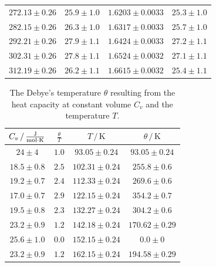 \begin{table}
\begin{tabular}{c c c c}
        $272.13\pm0.26$ & $25.9\pm1.0$ & $1.6203\pm0.0033$ & $25.3\pm1.0$ \\
        $282.15\pm0.26$ & $26.3\pm1.0$ & $1.6317\pm0.0033$ & $25.7\pm1.0$ \\
        $292.21\pm0.26$ & $27.9\pm1.1$ & $1.6424\pm0.0033$ & $27.2\pm1.1$ \\
        $302.31\pm0.26$ & $27.8\pm1.1$ & $1.6524\pm0.0032$ & $27.1\pm1.1$ \\
        $312.19\pm0.26$ & $26.2\pm1.1$ & $1.6615\pm0.0032$ & $25.4\pm1.1$ \\
        \bottomrule
    \end{tabular}
\end{table}

\begin{table}
    \centering
    \caption{The Debye's temperature $\theta$ resulting from the heat capacity at constant volume $C_v$ and the temperature $T$.}
    \label{tab:debye}
    \begin{tabular}{c c c c}
        \toprule
        $C_v \,/\, \unit{\frac{\joule}{\mol \cdot \kelvin}}$ & $\frac{\theta}{T}$ & $T \,/\, \unit{\kelvin}$ & $\theta \,/\, \unit{\kelvin}$ \\
        \midrule
        $24\pm4$ & $1.0$ & $93.05\pm0.24$ & $93.05\pm0.24$ \\
        $18.5\pm0.8$ & $2.5$ & $102.31\pm0.24$ & $255.8\pm0.6$ \\
        $19.2\pm0.7$ & $2.4$ & $112.33\pm0.24$ & $269.6\pm0.6$ \\
        $17.0\pm0.7$ & $2.9$ & $122.15\pm0.24$ & $354.2\pm0.7$ \\
        $19.5\pm0.8$ & $2.3$ & $132.27\pm0.24$ & $304.2\pm0.6$ \\
        $23.2\pm0.9$ & $1.2$ & $142.18\pm0.24$ & $170.62\pm0.29$ \\
        $25.6\pm1.0$ & $0.0$ & $152.15\pm0.24$ & $0.0\pm0$ \\
        $23.2\pm0.9$ & $1.2$ & $162.15\pm0.24$ & $194.58\pm0.29$ \\
        \bottomrule
    \end{tabular}
\end{table}